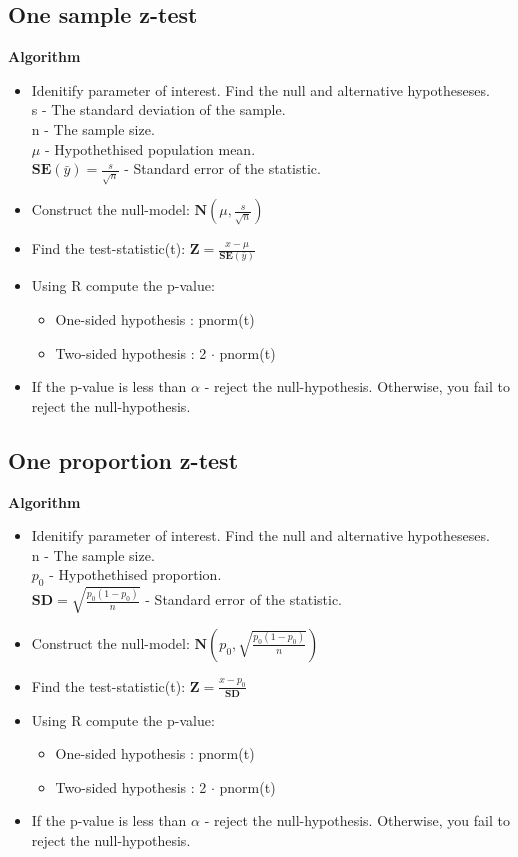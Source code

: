 \documentclass{article}
\begin{document}
\subsection{One sample z-test}
\textbf{Algorithm}
\begin{itemize}
\item Idenitify parameter of interest. Find the null and alternative hypotheseses.\\
      s - The standard deviation of the sample.\\
      n - The sample size.\\
      $\mu$ - Hypothethised population mean.\\
      $\mathbf{SE}(\bar{y}) = \frac{s}{\sqrt{n}}$ - Standard error of the statistic.
\item Construct the null-model: $\mathbf{N}(\mu,\frac{s}{\sqrt{n}})$
\item Find the test-statistic(t): $\mathbf{Z} = \frac{x-\mu}{\mathbf{SE}(\bar{y})}$
\item Using R compute the p-value:
\begin{itemize}
    \item One-sided hypothesis : pnorm(t)
    \item Two-sided hypothesis : 2 $\cdot$ pnorm(t)
\end{itemize}
\item If the p-value is less than $\alpha$ - reject the null-hypothesis. 
    Otherwise, you fail to reject the null-hypothesis.
\end{itemize}
\subsection{One proportion z-test}
\textbf{Algorithm}
\begin{itemize}
\item Idenitify parameter of interest. Find the null and alternative hypotheseses.\\
      n - The sample size.\\
      $p_0$ - Hypothethised proportion.\\
      $\mathbf{SD} = \sqrt{\frac{p_0(1-p_0)}{n}}$ - Standard error of the statistic.
\item Construct the null-model: $\mathbf{N}(p_0,\sqrt{\frac{p_0(1-p_0)}{n}})$
\item Find the test-statistic(t): $\mathbf{Z} = \frac{x-p_0}{\mathbf{SD}}$
\item Using R compute the p-value:
\begin{itemize}
    \item One-sided hypothesis : pnorm(t)
    \item Two-sided hypothesis : 2 $\cdot$ pnorm(t)
\end{itemize}
\item If the p-value is less than $\alpha$ - reject the null-hypothesis. 
    Otherwise, you fail to reject the null-hypothesis.
\end{itemize}
\end{document}

